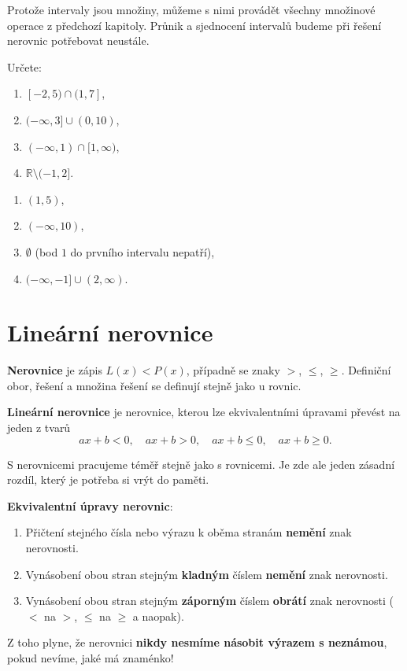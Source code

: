 Protože intervaly jsou množiny, můžeme s nimi provádět všechny množinové operace z předchozí kapitoly. Průnik a sjednocení intervalů budeme při řešení nerovnic potřebovat neustále.

\begin{problem}
  Určete:
  \begin{enumerate}[label=(\alph*)]
    \item $[-2, 5)\cap(1, 7]$,
    \item $(-\infty, 3]\cup(0, 10)$,
    \item $(-\infty, 1)\cap[1, \infty)$,
    \item $\mathbb{R}\setminus(-1, 2]$.
  \end{enumerate}
\end{problem}

\begin{solution}
  \begin{enumerate}[label=(\alph*)]
    \item $(1, 5)$,
    \item $(-\infty, 10)$,
    \item $\emptyset$ (bod $1$ do prvního intervalu nepatří),
    \item $(-\infty, -1]\cup(2, \infty)$.
  \end{enumerate}
\end{solution}

\section{Lineární nerovnice}\label{sec:linearni-nerovnice}

\begin{definitionbox}
  \textbf{Nerovnice} je zápis $L(x) < P(x)$, případně se znaky $>$, $\leq$, $\geq$. Definiční obor, řešení a množina řešení se definují stejně jako u rovnic.

  \textbf{Lineární nerovnice} je nerovnice, kterou lze ekvivalentními úpravami převést na jeden z tvarů
  \begin{equation*}
    ax + b < 0,\quad ax + b > 0,\quad ax + b\leq 0,\quad ax + b\geq 0.
  \end{equation*}
\end{definitionbox}

S nerovnicemi pracujeme téměř stejně jako s rovnicemi. Je zde ale jeden zásadní rozdíl, který je potřeba si vrýt do paměti.

\begin{definitionbox}
  \textbf{Ekvivalentní úpravy nerovnic}:
  \begin{enumerate}
    \item Přičtení stejného čísla nebo výrazu k oběma stranám \textbf{nemění} znak nerovnosti.
    \item Vynásobení obou stran stejným \textbf{kladným} číslem \textbf{nemění} znak nerovnosti.
    \item Vynásobení obou stran stejným \textbf{záporným} číslem \textbf{obrátí} znak nerovnosti ($<$ na $>$, $\leq$ na $\geq$ a naopak).
  \end{enumerate}
  Z toho plyne, že nerovnici \textbf{nikdy nesmíme násobit výrazem s neznámou}, pokud nevíme, jaké má znaménko!
\end{definitionbox}

